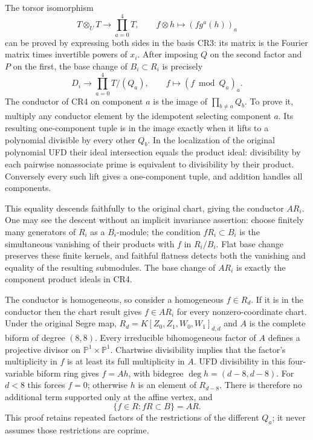 The torsor isomorphism
\[
 T\otimes_U T\longrightarrow\prod_{a=0}^4T,
 \qquad f\otimes h\longmapsto(fg^a(h))_a
\]
can be proved by expressing both sides in the basis CR3: its
matrix is the Fourier matrix times invertible powers of $x_i$.
After imposing $Q$ on the second factor and $P$ on the first,
the base change of $B_i\subset R_i$ is precisely
\[
 D_i\longrightarrow\prod_{a=0}^4T/(Q_a),
 \qquad f\longmapsto(f\bmod Q_a)_a.                            \tag{CR4}
\]
The conductor of CR4 on component $a$ is the image of
$\prod_{b\ne a}Q_b$.  To prove it, multiply any conductor element
by the idempotent selecting component $a$.  Its resulting one-component
tuple is in the image exactly when it lifts to a polynomial divisible
by every other $Q_b$.  In the localization of the original polynomial
UFD their ideal intersection equals the product ideal: divisibility
by each pairwise nonassociate prime is equivalent to divisibility by
their product.  Conversely every such lift gives a one-component
tuple, and addition handles all components.

This equality descends faithfully to the original chart, giving
the conductor $AR_i$.  One may see the descent without an implicit
invariance assertion: choose finitely many generators of $R_i$ as
a $B_i$-module; the condition $fR_i\subset B_i$ is the simultaneous
vanishing of their products with $f$ in $R_i/B_i$.  Flat base change
preserves these finite kernels, and faithful flatness detects both
the vanishing and equality of the resulting submodules.  The base
change of $AR_i$ is exactly the component product ideals in CR4.

The conductor is homogeneous, so consider a homogeneous $f\in R_d$.
If it is in the conductor then the chart result gives $f\in AR_i$
for every nonzero-coordinate chart.  Under the original Segre map,
$R_d=K[Z_0,Z_1,W_0,W_1]_{d,d}$ and $A$ is the complete biform of
degree $(8,8)$.  Every irreducible bihomogeneous factor of $A$
defines a projective divisor on $\mathbb P^1\times\mathbb P^1$.
Chartwise divisibility implies that the factor's multiplicity in
$f$ is at least its full multiplicity in $A$.  UFD divisibility
in this four-variable biform ring gives $f=Ah$, with bidegree
$\deg h=(d-8,d-8)$.  For $d<8$ this forces $f=0$; otherwise $h$
is an element of $R_{d-8}$.  There is therefore no additional
term supported only at the affine vertex, and
\[
 \boxed{\{f\in R:fR\subset B\}=AR.}                            \tag{CR5}
\]
This proof retains repeated factors of the restrictions of the
different $Q_a$; it never assumes those restrictions are coprime.

